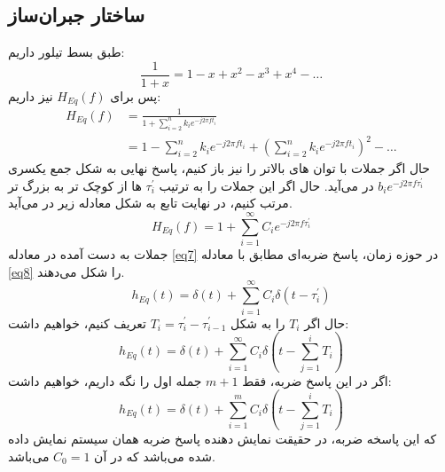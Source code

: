 \documentclass[10pt]{article}
\begin{document}
\subsection{ساختار جبران‌ساز}
طبق بسط تیلور داریم:
\[\frac{1}{1+x} = 1 - x + x^2 - x^3 + x^4 - \dots\]
پس برای 
$H_{Eq}(f)$
نیز داریم:
\begin{equation}\label{eq6}
\begin{split}
	H_{Eq}(f) &= \frac{1}{1 + \sum_{i=2}^{n} k_i e^{-j2\pi f t_i} } \\
	&= 1 - \sum_{i=2}^{n} k_i e^{-j2\pi f t_i} + (\sum_{i=2}^{n} k_i e^{-j2\pi f t_i})^2 - \dots
\end{split}
\end{equation}
حال اگر جملات با توان های بالاتر را نیز باز کنیم، پاسخ نهایی به شکل جمع یکسری 
$b_i e^{-j2\pi f\tau_i^\prime}$
در می‌آید. حال اگر این جملات را به ترتیب 
$\tau_i^\prime$
ها از کوچک تر به بزرگ تر مرتب کنیم، در نهایت تابع به شکل معادله زیر در می‌آید.
\begin{equation}\label{eq7}
	H_{Eq}(f) = 1 + \sum_{i = 1}^{\infty} C_i e^{-j2\pi f \tau_i^\prime}
\end{equation}
جملات به دست آمده در معادله
 \eqref{eq7}
 در حوزه زمان، پاسخ ضربه‌ای مطابق با معادله 
 \eqref{eq8}
را شکل می‌دهند.
\begin{equation}\label{eq8}
	h_{Eq}(t) = \delta(t) + \sum_{i=1}^{\infty}C_i \delta(t-\tau_i^\prime)
\end{equation}
حال اگر 
$T_i$
را به شکل 
$T_i = \tau_i^\prime - \tau_{i-1}^\prime$
تعریف کنیم، خواهیم داشت:
\begin{equation}\label{eq9}
	h_{Eq}(t) = \delta(t) + \sum_{i=1}^{\infty} C_i \delta(t - \sum_{j=1}^{i} T_i)
\end{equation}
اگر در این پاسخ ضربه، فقط 
$m+1$
جمله اول را نگه داریم، خواهیم داشت:
\begin{equation}
	h_{Eq}(t) = \delta(t) + \sum_{i=1}^{m} C_i \delta(t - \sum_{j=1}^{i} T_i)
\end{equation}
که این پاسخه ضربه، در حقیقت نمایش دهنده پاسخ ضربه همان سیستم نمایش داده شده می‌باشد که در آن 
$C_0 = 1$
می‌باشد.

\newpage
\end{document}
